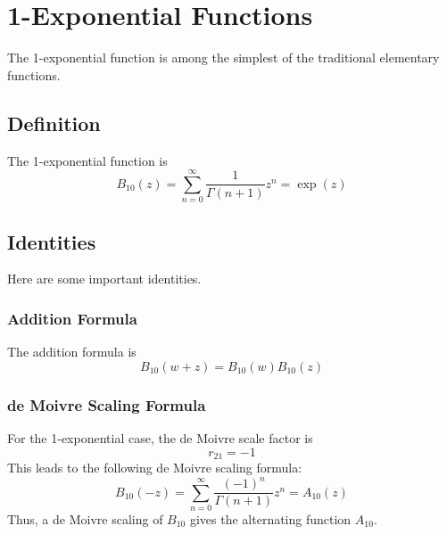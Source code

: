\chapter{1-Exponential Functions}
The 1-exponential function is among the simplest of the traditional elementary functions.
\section{Definition}
The 1-exponential function is
\begin{equation}
    B_{10}(z) = \sum_{n = 0}^{\infty} \frac{1}{\Gamma(n+1)} z^{n} = \exp(z)
\end{equation}
\section{Identities}
Here are some important identities.
\subsection{Addition Formula}
The addition formula is
\begin{equation}
    B_{10}(w + z) = B_{10}(w) B_{10}(z)
\end{equation}
\subsection{de Moivre Scaling Formula}
For the 1-exponential case, the de Moivre scale factor is
\begin{equation}
    r_{21} = -1
\end{equation}
This leads to the following de Moivre scaling formula:
\begin{equation}
    B_{10}(-z) = \sum_{n = 0}^{\infty} \frac{(-1)^{n}}{\Gamma(n + 1)} z^{n} = A_{10}(z)
\end{equation}
Thus, a de Moivre scaling of $B_{10}$ gives the alternating function $A_{10}$.
